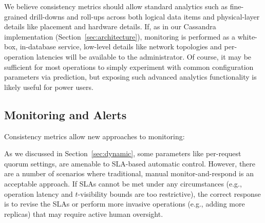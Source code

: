
We believe consistency metrics should allow standard analytics such as
fine-grained drill-downs and roll-ups across both logical data items
and physical-layer details like placement and hardware details. If, as
in our Cassandra implementation (Section~\ref{sec:architecture}),
monitoring is performed as a white-box, in-database service, low-level
details like network topologies and per-operation latencies will be
available to the administrator. Of course, it may be sufficient for most
operations to simply experiment with common configuration parameters via
prediction, but exposing such advanced analytics functionality is
likely useful for power users.

\subsection{Monitoring and Alerts}
\label{sec:monitoring}

Consistency metrics allow new approaches to monitoring:


As we discussed in Section~\ref{sec:dynamic}, some parameters like
per-request quorum settings, are amenable to SLA-based automatic
control. However, there are a number of scenarios where traditional,
manual monitor-and-respond is an acceptable approach. If SLAs cannot
be met under any circumstances (e.g., operation latency and
$t$-visibility bounds are too restrictive), the correct response is to
revise the SLAs or perform more invasive operations (e.g., adding more
replicas) that may require active human oversight.

